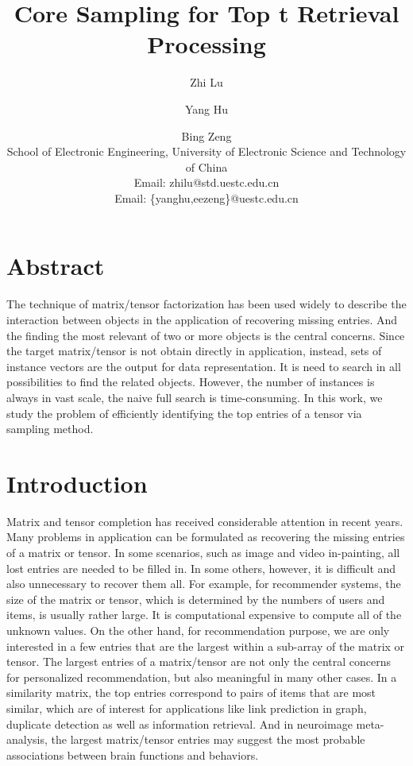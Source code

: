 \documentclass[letterpaper]{article}
\title{Core Sampling for Top t Retrieval Processing}
\author{Zhi Lu \and Yang Hu \and Bing Zeng\\
School of Electronic Engineering, University of Electronic Science and Technology of China\\
Email: zhilu@std.uestc.edu.cn\\
Email: \{yanghu,eezeng\}@uestc.edu.cn
}
\begin{document}
\maketitle
\section{Abstract}
The technique of matrix/tensor factorization has been used widely to describe the 
interaction between objects in the application of recovering missing entries.
And the finding the most relevant of two or more objects is the central concerns.
Since the target matrix/tensor is not obtain directly in application, instead,
sets of instance vectors are the output for data representation.
It is need to search in all possibilities to find the related objects.
However, the number of instances is always in vast scale, 
the naive full search is time-consuming.
In this work, we study the problem of efficiently
identifying the top entries of a tensor via sampling method.


\section{Introduction}
Matrix and tensor completion has received considerable attention in recent years. 
Many problems in application can be formulated as recovering the missing entries of a matrix or tensor. 
In some scenarios, such as image and video in-painting, 
all lost entries are needed to be filled in. 
In some others, however, it is difficult and also unnecessary to recover them all. 
For example, for recommender systems, the size of the matrix or tensor, 
which is determined by the numbers of users and items, is usually rather large. 
It is computational expensive to compute all of the unknown values. 
On the other hand, for recommendation purpose, 
we are only interested in a few entries that are the largest within a sub-array of the matrix or tensor. 
The largest entries of a matrix/tensor are not only the central concerns for personalized recommendation, 
but also meaningful in many other cases. 
In a similarity matrix, the top entries correspond to pairs of items that are most similar, 
which are of interest for applications like link prediction in graph, 
duplicate detection as well as information retrieval. 
And in neuroimage meta-analysis, 
the largest matrix/tensor entries may suggest the most probable associations between brain functions and behaviors.
\end{document}
